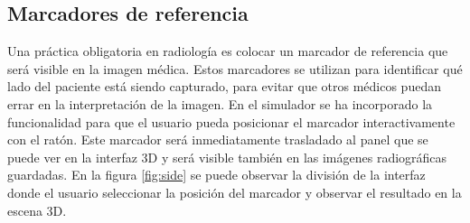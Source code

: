 \subsection{Marcadores de referencia}
\label{xray:sidemark}
Una práctica obligatoria en radiología es colocar un marcador de referencia que será visible en la imagen médica. Estos marcadores se utilizan para identificar qué lado del paciente está siendo capturado, para evitar que otros médicos puedan errar en la interpretación de la imagen. En el simulador se ha incorporado la funcionalidad para que el usuario pueda posicionar el marcador interactivamente con el ratón. Este marcador será inmediatamente trasladado al panel que se puede ver en la interfaz 3D y será visible también en las imágenes radiográficas guardadas. En la figura \ref{fig:side} se puede observar la división de la interfaz donde el usuario seleccionar la posición del marcador y observar el resultado en la escena 3D. 

